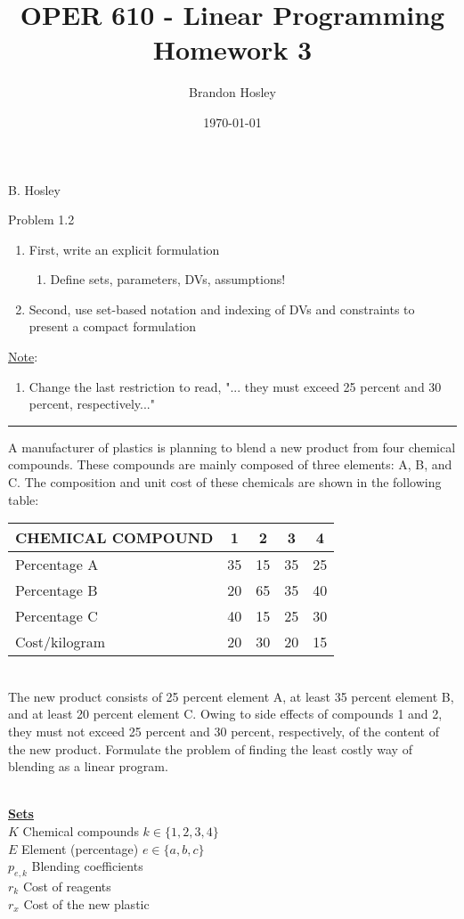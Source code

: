 \documentclass[answers]{exam}
\title{OPER 610 - Linear Programming%
	\\ Homework 3}
\author{Brandon Hosley}
\date{\today}
\begin{document}
\hspace{\fill} { B. Hosley}
\bigskip

\begin{questions}

\question 
Problem 1.2
\begin{enumerate}
	\item First, write an explicit formulation
	\begin{enumerate}
		\item Define sets, parameters, DVs, assumptions!
	\end{enumerate}
\item Second, use set-based notation and indexing of DVs and constraints to present a compact formulation
\end{enumerate}
\underline{Note}:
\begin{enumerate}
	\item Change the last restriction to read, "... they must exceed 25 percent and 30 percent, respectively..."
\end{enumerate}
\hrule
\bigskip
[1.2] A manufacturer of plastics is planning to blend a new product from four chemical compounds. These compounds are mainly composed of three elements: A, B, and C. The composition and unit cost of these chemicals are shown in the following table: \bigskip \\ 
\begin{tabular}{lcccc}
	\toprule
	CHEMICAL COMPOUND & 1 & 2 & 3 & 4 \\
	\midrule
	Percentage A  & 35 & 15 & 35 & 25 \\
	Percentage B  & 20 & 65 & 35 & 40 \\
	Percentage C  & 40 & 15 & 25 & 30 \\
	Cost/kilogram & 20 & 30 & 20 & 15 \\
	\bottomrule 
\end{tabular} \bigskip \\ 
The new product consists of 25 percent element A, at least 35 percent element B, and at least 20 percent element C. Owing to side effects of compounds 1 and 2, they must not exceed 25 percent and 30 percent, respectively, of the content of the new product. Formulate the problem of finding the least costly way of blending as a linear program.
\begin{solution} \\
	\textbf{\underline{Sets}} \\
	\(K\) Chemical compounds \(k\in\{1,2,3,4\}\) \\
	\(E\) Element (percentage) \(e\in\{a,b,c\}\) \\
	\(p_{e,k}\) Blending coefficients \\
	\(r_{k}\) Cost of reagents \\
	\(r_{x}\) Cost of the new plastic
	

\end{solution}
\end{questions}
\end{document}
